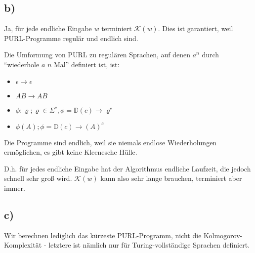\documentclass{article}
\begin{document}
\subsection*{b)}
Ja, für jede endliche Eingabe $w$ terminiert $\mathcal{K}(w)$. Dies ist garantiert, weil PURL-Programme regulär und endlich sind.

Die Umformung von PURL zu regulären Sprachen, auf denen $a^n$ durch "`wiederhole $a$ $n$ Mal"' definiert ist, ist:
\begin{itemize}\itemsep0em
	\item $\epsilon \rightarrow \epsilon$
  \item $AB \rightarrow AB$
  \item $\phi\!:\!\varrho; \varrho \in \Sigma^c, \phi=\mathbb{D}(c) \rightarrow \varrho^c$
  \item $\phi(A); \phi=\mathbb{D}(c) \rightarrow (A)^c$
\end{itemize}
Die Programme sind endlich, weil sie niemals endlose Wiederholungen ermöglichen, es gibt keine Kleenesche Hülle.

D.h. für jedes endliche Eingabe hat der Algorithmus endliche Laufzeit, die jedoch schnell sehr groß wird. $\mathcal{K}(w)$ kann also sehr lange brauchen, terminiert aber immer.

\subsection*{c)}
Wir berechnen lediglich das kürzeste PURL-Programm, nicht die Kolmogorov-Komplexität - letztere ist nämlich nur für Turing-vollständige Sprachen definiert.
\end{document}
